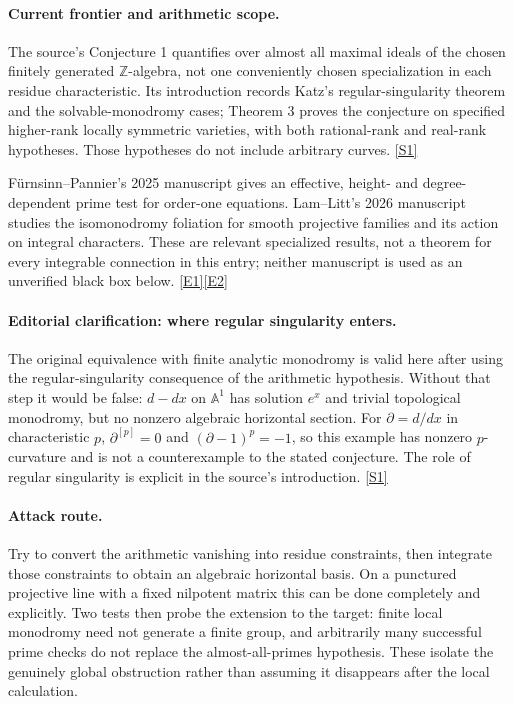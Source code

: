 \documentclass[11pt,a4paper]{article}
\newcommand{\Z}{\mathbb{Z}}
\newcommand{\A}{\mathbb{A}}
\newcommand{\sref}[2]{\hyperlink{source:#1:#2}{[S#2]}}
\newcommand{\eref}[2]{\hyperlink{extra:#1:#2}{[E#2]}}
\numberwithin{equation}{section}
\begin{document}
\paragraph{Current frontier and arithmetic scope.}
The source's Conjecture 1 quantifies over almost all maximal ideals of the
chosen finitely generated $\Z$-algebra, not one conveniently chosen
specialization in each residue characteristic. Its introduction records
Katz's regular-singularity theorem and the solvable-monodromy cases;
Theorem 3 proves the conjecture on specified higher-rank locally symmetric
varieties, with both rational-rank and real-rank hypotheses. Those hypotheses
do not include arbitrary curves. \sref{118}{1}

F\"urnsinn--Pannier's 2025 manuscript gives an effective, height- and
degree-dependent prime test for order-one equations. Lam--Litt's 2026
manuscript studies the isomonodromy foliation for smooth projective families
and its action on integral characters. These are relevant specialized
results, not a theorem for every integrable connection in this entry;
neither manuscript is used as an unverified black box below.
\eref{118}{1}\eref{118}{2}

\paragraph{Editorial clarification: where regular singularity enters.}
The original equivalence with finite analytic monodromy is valid here after
using the regular-singularity consequence of the arithmetic hypothesis.
Without that step it would be false: $d-dx$ on $\A^1$ has solution $e^x$ and
trivial topological monodromy, but no nonzero algebraic horizontal section.
For $\partial=d/dx$ in characteristic $p$, $\partial^{[p]}=0$ and
$(\partial-1)^p=-1$, so this example has nonzero $p$-curvature and is not a
counterexample to the stated conjecture. The role of regular singularity is
explicit in the source's introduction. \sref{118}{1}

\paragraph{Attack route.}
Try to convert the arithmetic vanishing into residue constraints, then
integrate those constraints to obtain an algebraic horizontal basis. On a
punctured projective line with a fixed nilpotent matrix this can be done
completely and explicitly. Two tests then probe the extension to the target:
finite local monodromy need not generate a finite group, and arbitrarily
many successful prime checks do not replace the almost-all-primes
hypothesis. These isolate the genuinely global obstruction rather than
assuming it disappears after the local calculation.
\end{document}
